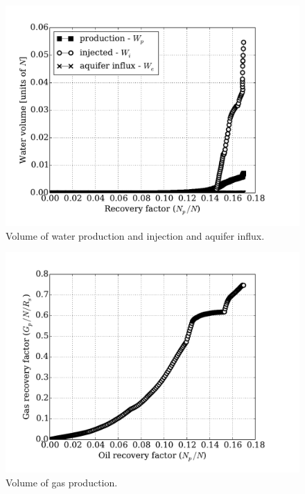 \documentclass[final,authoryear,5p,twocolumn,10pt]{elsarticle}
\begin{document}
\begin{figure}
\centering
\includegraphics[width=\linewidth]{./python/matbal_water}
\caption{Volume of water production and injection and aquifer influx.}
\label{fig: matbal_water}
\end{figure}

\begin{figure}
\centering
\includegraphics[width=\linewidth]{./python/matbal_gas}
\caption{Volume of gas production.}
\label{fig: matbal_gas}
\end{figure}
\end{document}
